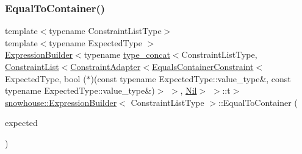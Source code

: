 \subsubsection{\texorpdfstring{EqualToContainer()}{EqualToContainer()}\hspace{0.1cm}{\footnotesize\ttfamily [1/2]}}
{\footnotesize\ttfamily template$<$typename Constraint\+List\+Type$>$ \\
template$<$typename Expected\+Type $>$ \\
\mbox{\hyperlink{structsnowhouse_1_1ExpressionBuilder}{Expression\+Builder}}$<$typename \mbox{\hyperlink{structsnowhouse_1_1type__concat}{type\+\_\+concat}}$<$Constraint\+List\+Type, \mbox{\hyperlink{structsnowhouse_1_1ConstraintList}{Constraint\+List}}$<$\mbox{\hyperlink{structsnowhouse_1_1ConstraintAdapter}{Constraint\+Adapter}}$<$\mbox{\hyperlink{structsnowhouse_1_1EqualsContainerConstraint}{Equals\+Container\+Constraint}}$<$Expected\+Type, bool ($\ast$)(const typename Expected\+Type\+::value\+\_\+type\&, const typename Expected\+Type\+::value\+\_\+type\&)$>$ $>$, \mbox{\hyperlink{structsnowhouse_1_1Nil}{Nil}}$>$ $>$\+::t$>$ \mbox{\hyperlink{structsnowhouse_1_1ExpressionBuilder}{snowhouse\+::\+Expression\+Builder}}$<$ Constraint\+List\+Type $>$\+::Equal\+To\+Container (\begin{DoxyParamCaption}\item[{const Expected\+Type \&}]{expected }\end{DoxyParamCaption})\hspace{0.3cm}{\ttfamily [inline]}}

\mbox{\label{structsnowhouse_1_1ExpressionBuilder_afbae8b5309b0d83ddc90c6393dae427e}} 
